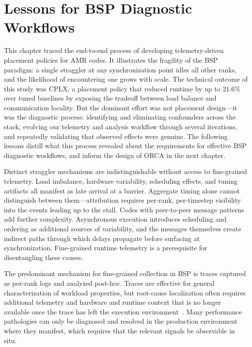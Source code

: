 
\section{Lessons for BSP Diagnostic Workflows}\label{sec:amr:concl}

This chapter traced the end-to-end process of developing telemetry-driven placement policies for
AMR codes.
It illustrates the fragility of the BSP paradigm:
a single straggler at any
synchronization point idles all other ranks, and the likelihood of encountering one grows with
scale.
The technical outcome of this study was CPLX, a placement policy that reduced runtime by up to
21.6\% over tuned baselines by exposing the tradeoff between load balance and communication
locality.
But the dominant effort was not placement design---it was the diagnostic process: identifying and
eliminating confounders across the stack, evolving our telemetry and analysis workflow through
several iterations, and repeatedly validating that observed effects were genuine.
The following lessons distill what this process revealed about the requirements for effective BSP
diagnostic workflows, and inform the design of ORCA in the next chapter.


\noindent Distinct straggler mechanisms are indistinguishable without access to fine-grained
telemetry.
Load imbalance, hardware variability, scheduling effects, and tuning artifacts all manifest as
late arrival at a barrier.
Aggregate timing alone cannot distinguish between them---attribution requires per-rank,
per-timestep visibility into the events leading up to the stall.
Codes with peer-to-peer message patterns add further complexity.
Asynchronous execution introduces scheduling and ordering as additional sources of variability,
and the messages themselves create indirect paths through which delays propagate before surfacing
at synchronization.
Fine-grained runtime telemetry is a prerequisite for disentangling these causes.


\noindent The predominant mechanism for fine-grained collection in BSP is traces captured as
per-rank logs
and analyzed post-hoc.
Traces are effective for general characterization of workload properties, but root-cause
localization often requires additional telemetry and hardware and runtime context that is no longer
available once the
trace has left the execution environment~\cite{Klenk2017:OverviewMPICharacteristics}.
Many performance pathologies can only be diagnosed and resolved in the production environment
where they manifest, which requires that the relevant signals be observable in situ.

